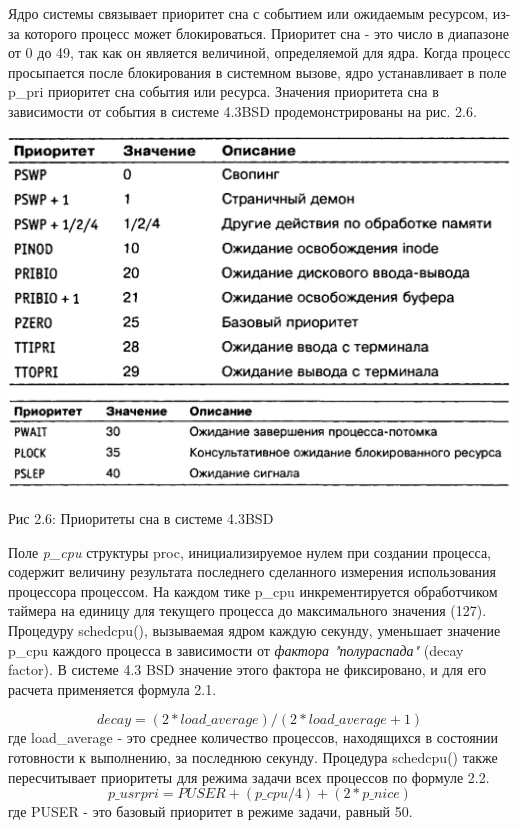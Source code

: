 \documentclass[12pt]{report}
\begin{document}
Ядро системы связывает приоритет сна с событием или ожидаемым ресурсом, из-за которого процесс может блокироваться. Приоритет сна - это число в диапазоне от 0 до 49, так как он является величиной, определяемой для ядра. Когда процесс просыпается после блокирования в системном вызове, ядро устанавливает в поле p\_pri приоритет сна события или ресурса. Значения приоритета сна в зависимости от события в системе 4.3BSD продемонстрированы на рис. 2.6.

\begin{center}
		\includegraphics[scale=0.6]{pics/SystemPriority.png}
		
			Рис 2.6: Приоритеты сна в системе 4.3BSD
\end{center}

Поле \textit{p\_cpu} структуры proc, инициализируемое нулем при создании процесса, содержит величину результата последнего сделанного измерения использования процессора процессом. На каждом тике p\_cpu инкрементируется обработчиком таймера на единицу для текущего процесса до максимального значения (127). 
Процедуру schedcpu(), вызываемая ядром каждую секунду, уменьшает значение p\_cpu каждого процесса в зависимости от \textit{фактора "полураспада"} (decay factor). В системе 4.3 BSD значение этого фактора не фиксировано, и для его расчета применяется формула 2.1.

\begin{equation}
decay = (2 * load\_average) / (2 * load\_average + 1)
\end{equation}
где load\_average - это среднее количество процессов, находящихся в состоянии готовности к выполнению, за последнюю секунду. Процедура schedcpu() также пересчитывает приоритеты для режима задачи всех процессов по формуле 2.2.
\begin{equation}
p\_usrpri = PUSER + (p\_cpu / 4) + (2 * p\_nice)
\end{equation}
где PUSER - это базовый приоритет в режиме задачи, равный 50.
\end{document}
